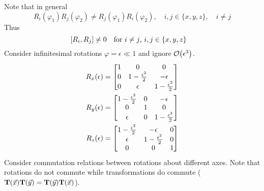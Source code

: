 \documentclass[12pt,a4paper,titlepage]{article}
\begin{document}
Note that in general
\begin{equation}
R_{i}(\varphi_{1})R_{j}(\varphi_{2})\neq R_{j}(\varphi_{1})R_{i}(\varphi_{2}),\quad i,j\in\{x,y,z\},\quad i\neq j
\end{equation}
Thus
\begin{equation}
\comm{R_{i}}{R_{j}}\neq 0\qq{for $i\neq j$, $i,j\in\{x,y,z\}$}
\end{equation}
Consider infinitesimal rotations $\varphi=\epsilon\ll1$ and ignore $\order{\epsilon^{3}}$.
\begin{equation}
\begin{aligned}
R_{x}(\epsilon)&=\mqty[1 & 0 & 0 \\ 0 & 1-\frac{\epsilon^{2}}{2} & -\epsilon \\ 0 & \epsilon & 1-\frac{\epsilon^{2}}{2}]\\
R_{y}(\epsilon)&=\mqty[1-\frac{\epsilon^{2}}{2} & 0 & -\epsilon \\ 0 & 1 & 0 \\ \epsilon & 0 & 1-\frac{\epsilon^{2}}{2}]\\
R_{z}(\epsilon)&=\mqty[1-\frac{\epsilon^{2}}{2} & -\epsilon & 0 \\ \epsilon & 1-\frac{\epsilon^{2}}{2} & 0 \\ 0 & 0 & 1]
\end{aligned}
\end{equation}
Consider commutation relations between rotations about different axes. Note that rotations do not commute while transformations do commute ($\vb{T}(\vec{x})\vb{T}(\vec{y})=\vb{T}(\vec{y})\vb{T}(\vec{x})$).
\begin{center}
\end{center}
\end{document}
